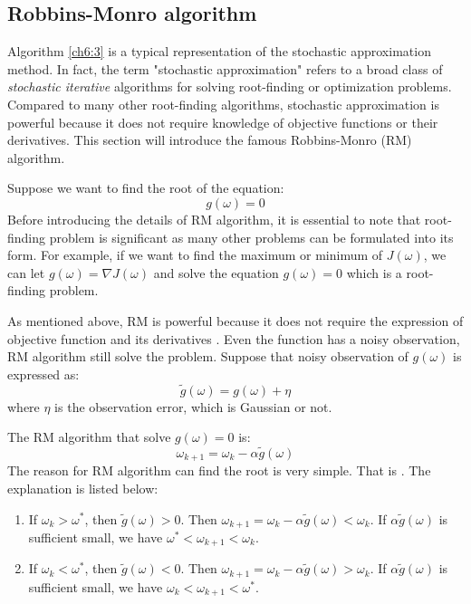 \subsection{Robbins-Monro algorithm}
Algorithm \ref{ch6:3} is a typical representation of the stochastic approximation method. In fact, the term "stochastic approximation" refers
to a broad class of \emph{stochastic iterative} algorithms for solving root-finding or optimization problems. Compared to many other
root-finding algorithms, stochastic approximation is powerful because it does not require knowledge of objective functions or their
derivatives. This section will introduce the famous Robbins-Monro (RM) algorithm. \par

Suppose we want to find the root of the equation:
\begin{equation*}
	g(\omega) = 0
\end{equation*}
Before introducing the details of RM algorithm, it is essential to note that root-finding problem is significant as many other problems can be formulated into its form. For example, if we want to find the maximum or minimum of $J(\omega)$, we can let $g(\omega) = \nabla J(\omega)$ and solve the equation $g(\omega)=0$ which is a root-finding problem. \par
As mentioned above, RM is powerful because it does not require the expression of objective function and its derivatives . Even the function has a noisy observation, RM algorithm
still solve the problem. Suppose that noisy observation of $g(\omega)$ is expressed as:
\begin{equation*}
	\tilde{g}(\omega) = g(\omega) + \eta
\end{equation*}
where $\eta$ is the observation error, which is Gaussian or not. \par
The RM algorithm that solve $g(\omega)=0$ is:
\begin{equation}\label{rm_algorithm}
	\omega_{k+1}=\omega_{k}-\alpha\tilde{g}(\omega)
\end{equation}
The reason for RM algorithm can find the root is very simple. That is {}. The explanation is listed below:
\begin{enumerate}

	\item If $\omega_{k}>\omega^{*}$, then $\tilde{g}(\omega)>0$. Then $\omega_{k+1}=\omega_{k}-\alpha\tilde{g}(\omega)<\omega_{k}$. If
	      $\alpha\tilde{g}(\omega)$ is sufficient small, we have $\omega^{*}<\omega_{k+1}<\omega_{k}$.
	\item If $\omega_{k}<\omega^{*}$, then $\tilde{g}(\omega)<0$. Then $\omega_{k+1}=\omega_{k}-\alpha\tilde{g}(\omega)>\omega_{k}$. If
	      $\alpha\tilde{g}(\omega)$ is sufficient small, we have $\omega_{k}<\omega_{k+1}<\omega^{*}$.

\end{enumerate}
